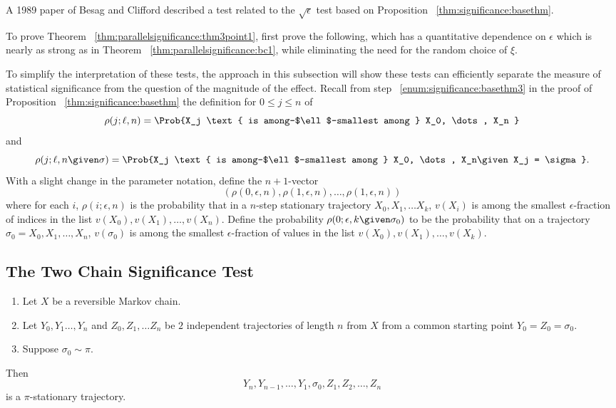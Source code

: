\documentclass[12pt]{article}
\begin{document}
A 1989 paper of Besag and Clifford
\cite{besag89} described a test related to the \( \sqrt{\epsilon} \)
test based on Proposition~%
\ref{thm:significance:basethm}.

\begin{remark}
    To prove Theorem~%
    \ref{thm:parallelsignificance:thm3point1}, first prove the following, which
    has a quantitative dependence on \( \epsilon \) which is nearly as
    strong as in Theorem~%
    \ref{thm:parallelsignificance:bc1}, while eliminating the need for the
    random choice of \( \xi \).
\end{remark}

To simplify the interpretation of these tests, the approach in this
subsection will show these tests can efficiently separate the measure of
statistical significance from the question of the magnitude of the
effect.  Recall from step~%
\ref{enum:significance:basethm3} in the proof of
Proposition~%
\ref{thm:significance:basethm} the definition for \( 0 \le j \le n \) of
\[
    \rho(j; \ell, n) = \Prob{X_j \text{ is among-$\ell$-smallest
    among } X_0, \dots, X_n }
\] and
\[
  \rho(j; \ell, n \given \sigma) = \Prob{X_j
    \text{ is among-$\ell$-smallest among } X_0, \dots, X_n%
    \given X_j = \sigma }.
\] With a slight change in the parameter notation, define the \( n+1 \)-vector
\[ (\rho(0, \epsilon, n), \rho(1, \epsilon, n), \dots, \rho(1, \epsilon,
  n)) \]
where for each \( i \), \( \rho(i; \epsilon, n) \) is the
probability that in a \( n \)-step stationary trajectory \( X_0, X_1,
\dots X_k \), \( v(X_i) \) is among the smallest \( \epsilon
\)-fraction of indices
in the list \( v(X_0), v(X_1), \dots, v(X_n) \).  Define the probability
\( \rho(0; \epsilon, k \given \sigma_0) \) to be the probability that on a
trajectory \( \sigma_0 = X_0, X_1, \dots, X_n \), \( v(\sigma_0) \) is
among the smallest \( \epsilon \)-fraction of values in the list \( v(X_0),
v(X_1), \dots, v(X_k) \).

\subsection*{The Two Chain Significance Test}

\begin{lemma}
    \begin{enumerate}
        \item
            Let \( X \) be a reversible Markov chain.
        \item
            Let \( Y_0, Y_1 \dots, Y_n \) and \( Z_0, Z_1, \dots Z_n \)
            be \( 2 \) independent trajectories of length \( n \) from \(
            X \) from a common starting point \( Y_0 = Z_0 = \sigma_0 \).
        \item
            Suppose \( \sigma_0 \sim \pi \).
    \end{enumerate}
    Then
            \[
                Y_n, Y_{n-1}, \dots, Y_1, \sigma_0, Z_1, Z_2, \dots, Z_n
            \] is a \( \pi \)-stationary trajectory.
\end{lemma}
\end{document}
